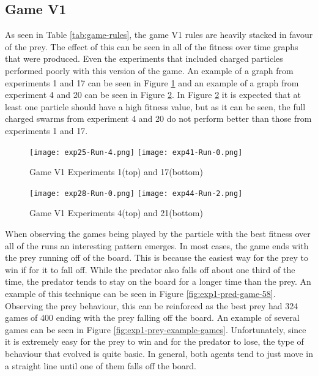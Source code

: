 \subsection{Game V1}
As seen in Table \ref{tab:game-rules}, the game V1 rules are heavily stacked in favour of the prey. The effect of this can be seen in all of the fitness over time graphs that were produced. Even the experiments that included charged particles performed poorly with this version of the game. An example of a graph from experiments 1 and 17 can be seen in Figure \ref{fig:v1-no-charged-graphs} and an example of a graph from experiment 4 and 20 can be seen in Figure \ref{fig:v1-fully-charged-graphs}. In Figure \ref{fig:v1-fully-charged-graphs} it is expected that at least one particle should have a high fitness value, but as it can be seen, the full charged swarms from experiment 4 and 20 do not perform better than those from experiments 1 and 17.

\begin{figure}
  \centering
  \texttt{[image: exp25-Run-4.png]}  
  \texttt{[image: exp41-Run-0.png]}
  \caption{Game V1 Experiments 1(top) and 17(bottom)}
  \label{fig:v1-no-charged-graphs}
\end{figure}


\begin{figure}
  \centering
  \texttt{[image: exp28-Run-0.png]}  
  \texttt{[image: exp44-Run-2.png]}
  \caption{Game V1 Experiments 4(top) and 21(bottom)}
  \label{fig:v1-fully-charged-graphs}
\end{figure}

When observing the games being played by the particle with the best fitness over all of the runs an interesting pattern emerges. In most cases, the game ends with the prey running off of the board. This is because the easiest way for the prey to win if for it to fall off. While the predator also falls off about one third of the time, the predator tends to stay on the board for a longer time than the prey. An example of this technique can be seen in Figure \ref{fig:exp1-pred-game-58}. Observing the prey behaviour, this can be reinforced as the best prey had 324 games of 400 ending with the prey falling off the board. An example of several games can be seen in Figure \ref{fig:exp1-prey-example-games}. Unfortunately, since it is extremely easy for the prey to win and for the predator to lose, the type of behaviour that evolved is quite basic. In general, both agents tend to just move in a straight line until one of them falls off the board.


